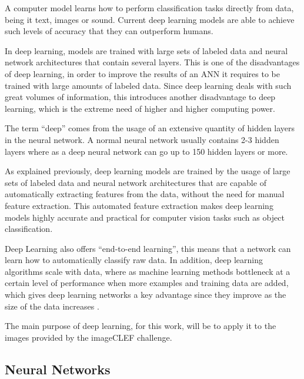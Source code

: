     \par A computer model learns how to perform classification tasks directly from data, being it text, images or sound. Current deep learning models are able to achieve such levels of accuracy that they can outperform humans.

    \par In deep learning, models are trained with large sets of labeled data and neural network architectures that contain several layers. This is one of the disadvantages of deep learning, in order to improve the results of an ANN it requires to be trained with large amounts of labeled data. Since deep learning deals with such great volumes of information, this introduces another disadvantage to deep learning, which is the extreme need of higher and higher computing power.

   
        
    \par The term \enquote{deep} comes from the usage of an extensive quantity of hidden layers in the neural network. A normal neural network usually contains 2-3 hidden layers where as a deep neural network can go up to 150 hidden layers or more.

    \par As explained previously, deep learning models are trained by the usage of  large sets of labeled data and neural network architectures that are capable of automatically extracting features from the data, without the need for manual feature extraction. This automated feature extraction makes deep learning models highly accurate and practical for computer vision tasks such as object classification. 
    
    \par Deep Learning also offers \enquote{end-to-end learning}, this means that a network can learn how to automatically classify raw data. In addition, deep learning algorithms scale with data, where as machine learning methods bottleneck at a certain level of performance when more examples and training data are added, which gives deep learning networks a key advantage since they improve as the size of the data increases \cite{mathworks_deeplearning}.


    The main purpose of deep learning, for this work, will be to apply it to the images provided by the imageCLEF challenge.


\subsection{Neural Networks}
\label{sec:neuralnet}

